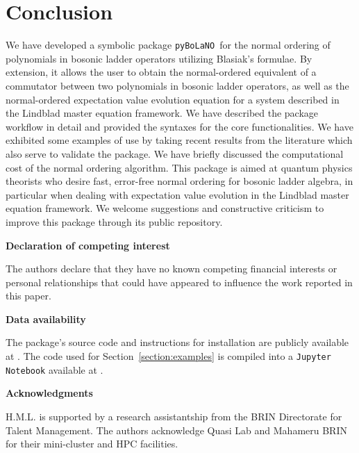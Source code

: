 \documentclass[5p, twocolumn, 10pt, sort&compress]{elsarticle}
\newcounter{bla}
\newcommand{\pybolano}{\texttt{pyBoLaNO}~}
\begin{document}

\section{Conclusion}\label{section:conclusion}

We have developed a symbolic package \pybolano for the normal ordering of polynomials in bosonic ladder operators utilizing Blasiak's formulae. By extension, it allows the user to obtain the normal-ordered equivalent of a commutator between two polynomials in bosonic ladder operators, as well as the normal-ordered expectation value evolution equation for a system described in the Lindblad master equation framework. We have described the package workflow in detail and provided the syntaxes for the core functionalities. We have exhibited some examples of use by taking recent results from the literature which also serve to validate the package. We have briefly discussed the computational cost of the normal ordering algorithm. This package is aimed at quantum physics theorists who desire fast, error-free normal ordering for bosonic ladder algebra, in particular when dealing with expectation value evolution in the Lindblad master equation framework. We welcome suggestions and constructive criticism to improve this package through its public repository. 


\medskip
\noindent\textbf{Declaration of competing interest}
\medskip

The authors declare that they have no known competing financial interests or personal relationships that could have appeared to influence the work reported in this paper.

\medskip
\noindent\textbf{Data availability}
\medskip

The package's source code and instructions for installation are publicly available at \href{https://github.com/hendry24/pyBoLaNO}{}. The code used for Section~\ref{section:examples} is compiled into a \texttt{Jupyter Notebook} available at \href{https://github.com/hendry24/pyBoLaNO/blob/main/tutorial.ipynb}{}. 

\medskip
\noindent\textbf{Acknowledgments}
\medskip

H.M.L. is supported by a research assistantship from the BRIN Directorate for Talent Management.  The authors acknowledge Quasi Lab and Mahameru BRIN for their mini-cluster and HPC facilities. 



\end{document}
